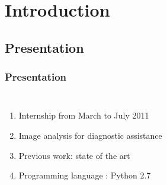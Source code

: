 
\section{Introduction}

	\subsection[Presentation]{Presentation}
		\begin{frame}
			\frametitle{Presentation}			
			\begin{columns}[c]
			\column{25em}
				\begin{enumerate}
					\item Internship from March to July 2011
					\item Image analysis for diagnostic assistance
					\item Previous work: state of the art
					\item Programming language : Python 2.7
 				\end{enumerate}	
				\column{5em}
				\vspace{1em}
				\vspace{1em}		
			\end{columns}
			\end{frame}



